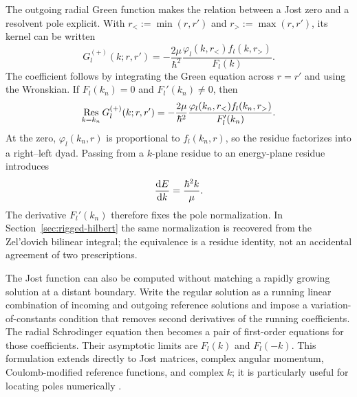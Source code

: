 The outgoing radial Green function makes the relation between a Jost zero and
a resolvent pole explicit.  With $r_<:=\min(r,r')$ and
$r_>:=\max(r,r')$, its kernel can be written
\begin{equation}
  G_l^{(+)}(k;r,r')
  =-\frac{2\mu}{\hbar^2}
  \frac{\varphi_l(k,r_<)f_l(k,r_>)}{F_l(k)} .
  \label{eq:radial-green-jost}
\end{equation}
The coefficient follows by integrating the Green equation across $r=r'$ and
using the Wronskian.  If $F_l(k_n)=0$ and $F_l'(k_n)\ne0$, then
\begin{equation}
  \operatorname*{Res}_{k=k_n}G_l^{(+)}(k;r,r')
  =-\frac{2\mu}{\hbar^2}
  \frac{\varphi_l(k_n,r_<)f_l(k_n,r_>)}{F_l'(k_n)} .
  \label{eq:radial-green-residue}
\end{equation}
At the zero, $\varphi_l(k_n,r)$ is proportional to $f_l(k_n,r)$, so the
residue factorizes into a right--left dyad.  Passing from a $k$-plane residue
to an energy-plane residue introduces
\begin{equation}
  \frac{\mathrm{d} E}{\mathrm{d} k}=\frac{\hbar^2k}{\mu} .
  \label{eq:k-to-energy-residue}
\end{equation}
The derivative $F_l'(k_n)$ therefore fixes the pole normalization.  In
Section~\ref{sec:rigged-hilbert} the same normalization is recovered from the
Zel'dovich bilinear integral; the equivalence is a residue identity, not an
accidental agreement of two prescriptions.

The Jost function can also be computed without matching a rapidly growing
solution at a distant boundary.  Write the regular solution as a running
linear combination of incoming and outgoing reference solutions and impose a
variation-of-constants condition that removes second derivatives of the
running coefficients.  The radial Schrodinger equation then becomes a pair
of first-order equations for those coefficients.  Their asymptotic limits are
$F_l(k)$ and $F_l(-k)$.  This formulation extends directly to Jost matrices,
complex angular momentum, Coulomb-modified reference functions, and complex
$k$; it is particularly useful for locating poles numerically
\cite{Rakityansky:2022Jost}.

